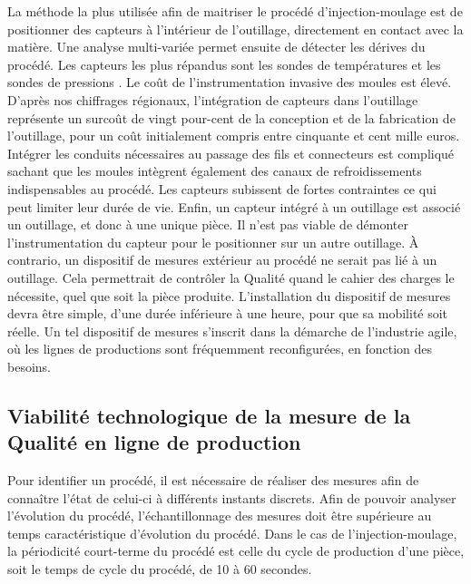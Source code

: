 La méthode la plus utilisée afin de maitriser le procédé d'injection-moulage est de positionner des capteurs à l’intérieur de l'outillage, directement en contact avec la matière.
Une analyse multi-variée permet ensuite de détecter les dérives du procédé.
Les capteurs les plus répandus sont les sondes de températures et les sondes de pressions \cite{kurt_experimental_2009}.
Le coût de l’instrumentation invasive des moules est élevé.
D’après nos chiffrages régionaux, l’intégration de capteurs dans l'outillage représente un surcoût de vingt pour-cent de la conception et de la fabrication de l'outillage, pour un coût initialement compris entre cinquante et cent mille euros.
Intégrer les conduits nécessaires au passage des fils et connecteurs est compliqué sachant que les moules intègrent également des canaux de refroidissements indispensables au procédé.
Les capteurs subissent de fortes contraintes ce qui peut limiter leur durée de vie.
Enfin, un capteur intégré à un outillage est associé un outillage, et donc à une unique pièce.
Il n'est pas viable de démonter l'instrumentation du capteur pour le positionner sur un autre outillage.
À contrario, un dispositif de mesures extérieur au procédé ne serait pas lié à un outillage.
Cela permettrait de contrôler la Qualité quand le cahier des charges le nécessite, quel que soit la pièce produite.
L'installation du dispositif de mesures devra être simple, d'une durée inférieure à une heure, pour que sa mobilité soit réelle.
Un tel dispositif de mesures s'inscrit dans la démarche de l'industrie agile, où les lignes de productions sont fréquemment reconfigurées, en fonction des besoins.


\subsection{Viabilité technologique de la mesure de la Qualité en ligne de production}
Pour identifier un procédé, il est nécessaire de réaliser des mesures afin de connaître l'état de celui-ci à différents instants discrets.
Afin de pouvoir analyser l'évolution du procédé, l'échantillonnage des mesures doit être supérieure au temps caractéristique d'évolution du procédé.
Dans le cas de l'injection-moulage, la périodicité court-terme du procédé est celle du cycle de production d'une pièce, soit le temps de cycle du procédé, de 10 à 60 secondes.

